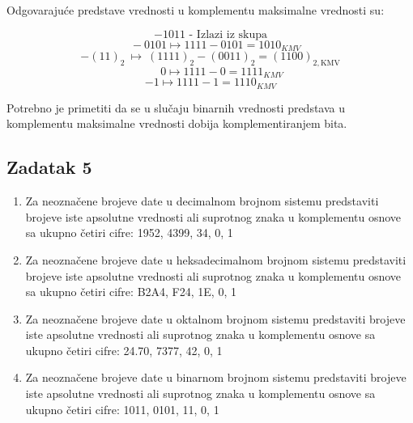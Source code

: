 \documentclass[a4paper,11pt]{article}
\numberwithin{equation}{section}
\begin{document}
Odgovarajuće predstave vrednosti u komplementu maksimalne vrednosti su:



\begin{equation}\label{eq:2.4.27}
\text{\(- 1011\) - Izlazi iz skupa}
\end{equation}
\begin{equation}\label{eq:2.4.28}
\ \ \ \  - 0101 \longmapsto 1111 - 0101 = 1010_{KMV}
\end{equation}
\begin{equation}\label{eq:2.4.29}
-(11)_2\ \longmapsto\ (1111)_2-(0011)_2=(1100)_{2,\mathrm{KMV}}
\end{equation}
\begin{equation}\label{eq:2.4.30}
\ \ \ \ \ \ \ \ \ 0 \longmapsto 1111 - 0 = 1111_{KMV}
\end{equation}
\begin{equation}\label{eq:2.4.31}
-1 \longmapsto 1111 - 1 = 1110_{KMV}
\end{equation}


Potrebno je primetiti da se u slučaju binarnih vrednosti predstava u komplementu maksimalne vrednosti dobija komplementiranjem bita.



\FloatBarrier
\subsection{Zadatak 5}\label{sec:2.5}


\begin{enumerate}[label=\alph*),start=1,leftmargin=*]
\item Za neoznačene brojeve date u decimalnom brojnom sistemu predstaviti brojeve iste apsolutne vrednosti ali suprotnog znaka u komplementu osnove sa ukupno četiri cifre: 1952, 4399, 34, 0, 1

\item Za neoznačene brojeve date u heksadecimalnom brojnom sistemu predstaviti brojeve iste apsolutne vrednosti ali suprotnog znaka u komplementu osnove sa ukupno četiri cifre: B2A4, F24, 1E, 0, 1

\item Za neoznačene brojeve date u oktalnom brojnom sistemu predstaviti brojeve iste apsolutne vrednosti ali suprotnog znaka u komplementu osnove sa ukupno četiri cifre: 24.70, 7377, 42, 0, 1

\item Za neoznačene brojeve date u binarnom brojnom sistemu predstaviti brojeve iste apsolutne vrednosti ali suprotnog znaka u komplementu osnove sa ukupno četiri cifre: 1011, 0101, 11, 0, 1

\end{enumerate}
\end{document}
